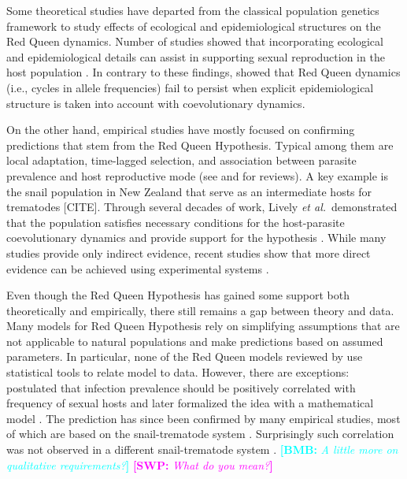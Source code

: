 \documentclass{article}\usepackage[]{graphicx}\usepackage[]{color}
\newcommand{\etal}{\textit{et al.}}
\newcommand{\comment}[3]{\textcolor{#1}{\textbf{[#2: }\textit{#3}\textbf{]}}}
\newcommand{\bmb}[1]{\comment{cyan}{BMB}{#1}}
\newcommand{\swp}[1]{\comment{magenta}{SWP}{#1}}
\begin{document}
Some theoretical studies have departed from the classical population genetics framework to study effects of ecological and epidemiological structures on the Red Queen dynamics.
Number of studies showed that incorporating ecological and epidemiological details can assist in supporting sexual reproduction in the host population \citep{galvani2001antigenic, galvani2003maintenance, lively2009maintenance, lively2010epidemiological}.
In contrary to these findings, \cite{macpherson2017joint} showed that Red Queen dynamics (i.e., cycles in allele frequencies) fail to persist when explicit epidemiological structure is taken into account with coevolutionary dynamics.

On the other hand, empirical studies have mostly focused on confirming predictions that stem from the Red Queen Hypothesis.
Typical among them are local adaptation, time-lagged selection, and association between parasite prevalence and host reproductive mode (see \cite{tobler2008expanding} and \cite{vergara2014infection} for reviews).
A key example is the snail population in New Zealand that serve as an intermediate hosts for trematodes [CITE].
Through several decades of work, Lively \etal\ demonstrated that the population satisfies necessary conditions for the host-parasite coevolutionary dynamics and provide support for the hypothesis \citep{lively1987evidence, lively1989adaptation, dybdahl1995host, dybdahl1998host, jokela2009maintenance, vergara2014infection, gibson2016within}.
While many studies provide only indirect evidence, 
recent studies show that more direct evidence can be achieved using experimental systems \citep{auld2016sex, slowinski2016coevolutionary}.

Even though the Red Queen Hypothesis has gained some support both theoretically and empirically, there still remains a gap between theory and data.
Many models for Red Queen Hypothesis rely on simplifying assumptions that are not applicable to natural populations and make predictions based on assumed parameters.
In particular, none of the Red Queen models reviewed by \cite{ashby2015diversity} use statistical tools to relate model to data.
However, there are exceptions:
\cite{lively1992parthenogenesis} postulated that infection prevalence should be positively correlated with frequency of sexual hosts and later formalized the idea with a mathematical model \citep{lively2001trematode}.
The prediction has since been confirmed by many empirical studies, most of which are based on the snail-trematode system \citep{lively2002temporal, kumpulainen2004parasites, vergara2013geographic, mckone2016fine, gibson2016within}.
Surprisingly such correlation was not observed in a different snail-trematode system \citep{dagan2013clonal}.
\bmb{A little more on qualitative requirements?}
\swp{What do you mean?}
\end{document}
